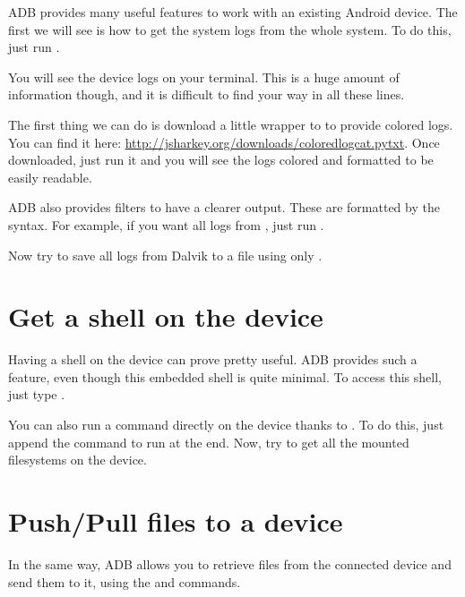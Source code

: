 ADB provides many useful features to work with an existing Android
device.  The first we will see is how to get the system logs from the
whole system. To do this, just run .

You will see the device logs on your terminal. This is a huge amount
of information though, and it is difficult to find your way in all
these lines.

The first thing we can do is download a little wrapper to 
to provide colored logs. You can find it here:
\url{http://jsharkey.org/downloads/coloredlogcat.pytxt}. Once
downloaded, just run it and you will see the logs colored and
formatted to be easily readable.

ADB also provides filters to have a clearer output. These are
formatted by the  syntax. For example, if you want
all logs from , just run .

Now try to save all logs from Dalvik to a file using only .

\section{Get a shell on the device}

Having a shell on the device can prove pretty useful. ADB provides
such a feature, even though this embedded shell is quite minimal. To
access this shell, just type .

You can also run a command directly on the device thanks to
. To do this, just append the command to run at the
end. Now, try to get all the mounted filesystems on the device.

\section{Push/Pull files to a device}

In the same way, ADB allows you to retrieve files from the connected
device and send them to it, using the  and 
commands.


